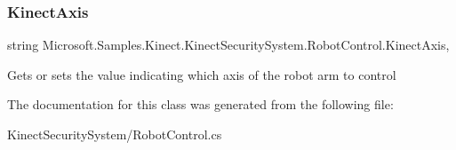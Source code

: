 \subsubsection{\texorpdfstring{Kinect\+Axis}{KinectAxis}}
{\footnotesize\ttfamily string Microsoft.\+Samples.\+Kinect.\+Kinect\+Security\+System.\+Robot\+Control.\+Kinect\+Axis\hspace{0.3cm}{\ttfamily [get]}, {\ttfamily [set]}}



Gets or sets the value indicating which axis of the robot arm to control 



The documentation for this class was generated from the following file\+:\begin{DoxyCompactItemize}
\item 
Kinect\+Security\+System/Robot\+Control.\+cs\end{DoxyCompactItemize}
